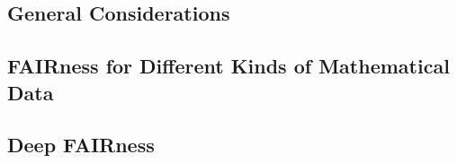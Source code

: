 

\subsection{General Considerations}
 

\subsection{FAIRness for Different Kinds of Mathematical Data}
 

\subsection{Deep FAIRness}\label{sec:deep}
 

\subsection{\dmh}\label{sec:hub}
 

